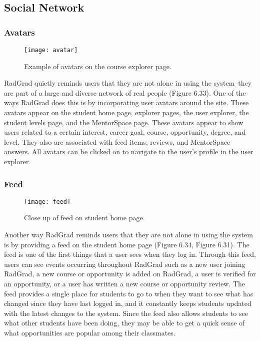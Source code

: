 \subsection{Social Network}
\subsubsection{Avatars}
\begin{figure}[htbp!]
\centering
\texttt{[image: avatar]}
\caption{Example of avatars on the course explorer page.}
\end{figure}
RadGrad quietly reminds users that they are not alone in using the system--they are part of a large and diverse network of real people (Figure 6.33). One of the ways RadGrad does this is by incorporating user avatars around the site. These avatars appear on the student home page, explorer pages, the user explorer, the student levels page, and the MentorSpace page. These avatars appear to show users related to a certain interest, career goal, course, opportunity, degree, and level. They also are associated with feed items, reviews, and MentorSpace answers. All avatars can be clicked on to navigate to the user's profile in the user explorer.  

\subsubsection{Feed}
\begin{figure}[htbp!]
\centering
\texttt{[image: feed]}
\caption{Close up of feed on student home page.}
\end{figure}
Another way RadGrad reminds users that they are not alone in using the system is by providing a feed on the student home page (Figure 6.34, Figure 6.31). The feed is one of the first things that a user sees when they log in. Through this feed, users can see events occurring throughout RadGrad such as a new user joining RadGrad, a new course or opportunity is added on RadGrad, a user is verified for an opportunity, or a user has written a new course or opportunity review. The feed provides a single place for students to go to when they want to see what has changed since they have last logged in, and it constantly keeps students updated with the latest changes to the system. Since the feed also allows students to see what other students have been doing, they may be able to get a quick sense of what opportunities are popular among their classmates.

